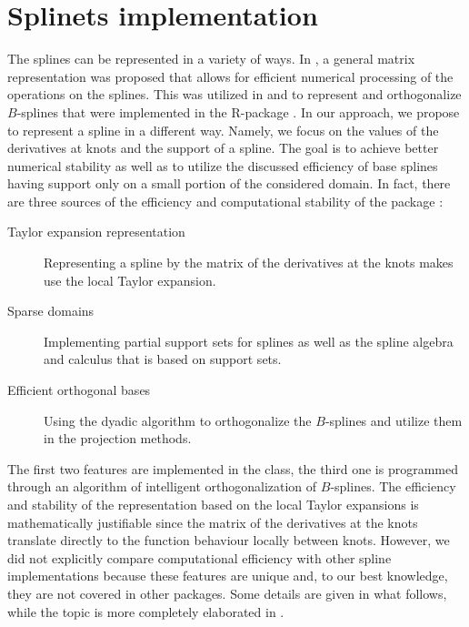 \section{ Splinets implementation}
\vspace{-.22cm}
The splines can be represented in a variety of ways. 
In \citet{Qin}, a general matrix representation was proposed that allows for efficient numerical processing of the operations on the splines. 
This was utilized in \citet{Zhou} and  \citet{Redd} to represent and orthogonalize $B$-splines that were implemented in the R-package  \citep{orthogonalsplinebasis}.
In our approach, we propose to represent a spline in a different way.
Namely, we focus on the values of the derivatives at knots and the support of a spline.  
The goal is to achieve better numerical stability as well as to utilize the discussed efficiency of base splines having support only on a small portion of the considered domain.
In fact, there are three sources of the efficiency and computational stability of the package :
\begin{description}
\item[Taylor expansion representation] Representing a spline by the matrix of the derivatives at the knots makes use the local Taylor expansion. 
\item[Sparse domains] Implementing partial support sets for splines as well as the spline algebra and calculus that is based on support sets.
\item[Efficient orthogonal bases] Using the dyadic algorithm to orthogonalize the $B$-splines and utilize them in the projection methods. 
\end{description}
The first two features are implemented in the  class, the third one is programmed through an algorithm of intelligent orthogonalization of $B$-splines. 
The efficiency and stability of the representation based on the local Taylor expansions is mathematically justifiable since the matrix of the derivatives at the knots translate directly to the function behaviour locally between knots.  However, we did not explicitly compare computational efficiency with other spline implementations because these features are unique and, to our best knowledge, they are not covered in other packages. Some details are given in what follows, while the topic is more completely elaborated in \citep{podgorski2021}.

